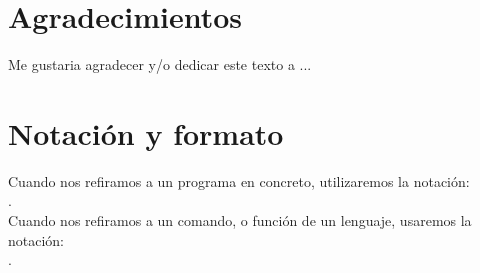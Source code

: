 

\section*{Agradecimientos}

Me gustaria agradecer y/o dedicar este texto a ...

\cleardoublepage


%
%

\cleardoublepage

\section*{Notación y formato}

Cuando nos refiramos a un programa en concreto, utilizaremos la
notación: \\ .\\

Cuando nos refiramos a un comando, o función de un lenguaje, usaremos
la notación: \\ .\\